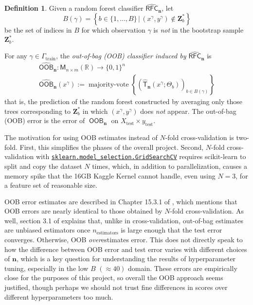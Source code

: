 \documentclass[11pt]{article}
\theoremstyle{definition}
\newtheorem{definition}{Definition}
\numberwithin{equation}{section}
\begin{document}
\begin{definition}\label{def:OOB}
  Given a random forest classifier $\operatorname{\widehat{\mathsf{RFC}}}_\mathbf{n}$,
  let
  \begin{equation}
    B(\gamma) = \left\{ b \in \{1, \ldots , B \} \, | \, (x^\gamma, y^\gamma) \not \in \mathbf{Z}^*_b \right\}
  \end{equation}
  be the set of indices in $B$ for which observation $\gamma$ is \emph{not} in the bootstrap sample $\mathbf{Z}^*_b$.

  For any $\gamma \in \Gamma_\text{train} $, the \emph{out-of-bag (OOB) classifier induced by $\operatorname{\widehat{\mathsf{RFC}}}_\mathbf{n}$} is
  \begin{equation}\label{eq:OOB}
      \begin{gathered}
            \operatorname{\widehat{\mathsf{OOB}}}_\mathbf{n} : \mathsf{M}_{n \times m} (\mathbb{R})  \rightarrow \{0, 1\}^n  \\
    \operatorname{\widehat{\mathsf{OOB}}}_\mathbf{n} (x^\gamma) := \operatorname{majority-vote} \left\{\left(\hat{\mathsf{T}}_\mathbf{n} \left(x^\gamma; \Theta_b\right)\right)_{b \in B(\gamma)}\right\}
           \end{gathered}  
  \end{equation}
  that is, the prediction of the random forest constructed by averaging only those trees corresponding to $\mathbf{Z}^*_b$ in which $(x^\gamma, y^\gamma)$ does \emph{not} appear. The out-of-bag (OOB) error is the error of $\operatorname{\mathsf{OOB}}_\mathbf{n}$ on $X_\text{test} \times y_\text{test} $.

\end{definition}

The motivation for using OOB estimates instead of \(N\)-fold
cross-validation is two-fold. First, this simplifies the phases of the
overall project. Second, \(N\)-fold cross-validation with
\href{https://scikit-learn.org/stable/modules/generated/sklearn.model_selection.GridSearchCV.html}{\texttt{sklearn.model\_selection.GridSearchCV}}
requires scikit-learn to split and copy the dataset \(N\) times, which,
in addition to parallelization, causes a memory spike that the 16GB
Kaggle Kernel cannot handle, even using \(N=3\), for a feature set of
reasonable size.


OOB error estimates are described in Chapter 15.3.1 of
\cite{hastieElementsStatisticalLearning2009}, which mentions that OOB
errors are nearly identical to those obtained by \(N\)-fold
cross-validation. As well, section 3.1 of
\cite{breimanRandomForests2001} explains that, unlike in
cross-validation, out-of-bag estimates are unbiased estimators once
\(n_\text{estimators}\) is large enough that the test error converges.
Otherwise, OOB \emph{over}estimates error. This does not directly speak
to how the difference between OOB error and test error varies with
different choices of $\mathbf{n}$,
which is a key question for understanding the results of hyperparameter
tuning, especially in the low \(B\) \((\approx 40)\)
domain. These errors are empirically close for the purposes of this
project, so overall the OOB approach seems justified, though perhaps we
should not trust fine differences in scores over different
hyperparameters too much.
\end{document}
